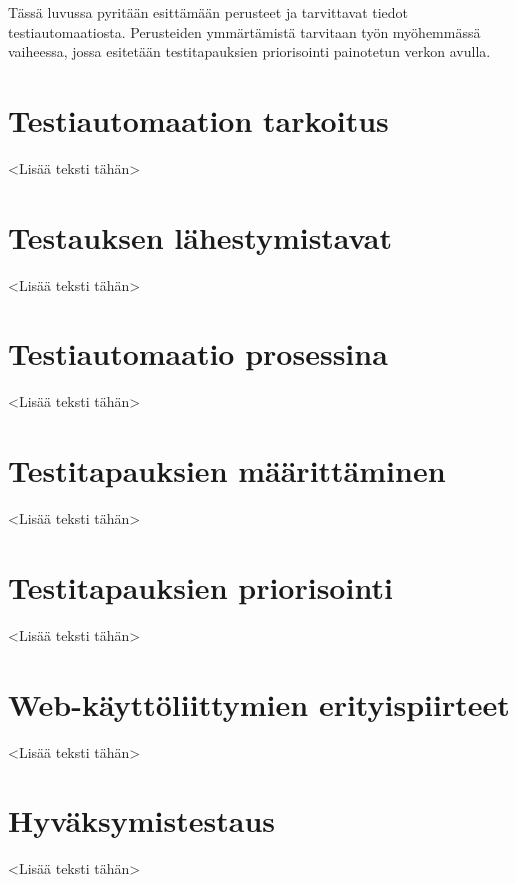 Tässä luvussa pyritään esittämään perusteet ja tarvittavat tiedot testiautomaatiosta.
Perusteiden ymmärtämistä tarvitaan työn myöhemmässä vaiheessa, jossa esitetään testitapauksien priorisointi painotetun verkon avulla.

\section{Testiautomaation tarkoitus}

<Lisää teksti tähän>

\section{Testauksen lähestymistavat}

<Lisää teksti tähän>

\section{Testiautomaatio prosessina}

<Lisää teksti tähän>

\section{Testitapauksien määrittäminen}

<Lisää teksti tähän>

\section{Testitapauksien priorisointi}

<Lisää teksti tähän>

\section{Web-käyttöliittymien erityispiirteet}

<Lisää teksti tähän>

\section{Hyväksymistestaus}

<Lisää teksti tähän>
